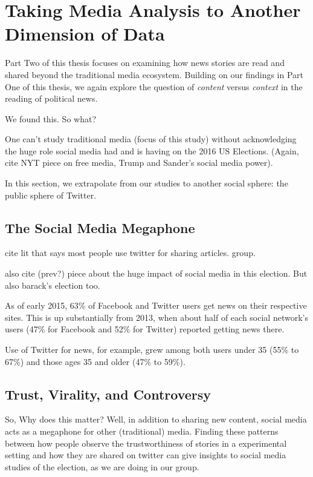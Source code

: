 \chapter{Taking Media Analysis to Another Dimension of Data}

Part Two of this thesis focuses on examining how news stories are read and shared beyond the traditional media ecosystem. Building on our findings in Part One of this thesis, we again explore the question of \emph{content} versus \emph{context} in the reading of political news.





We found this.
So what?

One can't study traditional media (focus of this study) without acknowledging the huge role social media had and is having on the 2016 US Elections. (Again, cite NYT piece on free media, Trump and Sander's social media power).

In this section, we extrapolate from our studies to another social sphere: the public sphere of Twitter. 



\section{The Social Media Megaphone}
cite lit that says most people use twitter for sharing articles.
group. 

also cite (prev?) piece about the huge impact of social media in this election. But also barack's election too.



As of early 2015, 63\% of Facebook and Twitter users get news on their respective sites. This is up substantially from 2013, when about half of each social network’s users (47\% for Facebook and 52\% for Twitter) reported getting news there.

Use of Twitter for news, for example, grew among both users under 35 (55\% to 67\%) and those ages 35 and older (47\% to 59\%). \cite{Pew-news-sharing}


\section{Trust, Virality, and Controversy}

So,
Why does this matter?
Well, in addition to sharing new content, social media acts as a megaphone for other (traditional) media. Finding these patterns between how people observe the trustworthiness of stories in a experimental setting and how they are shared on twitter can give insights to social media studies of the election, as we are doing in our group.


















